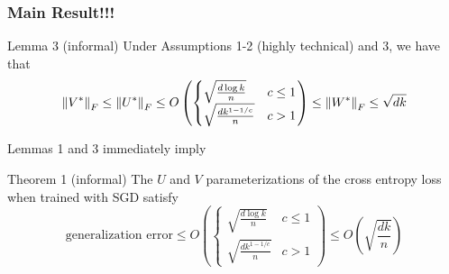 \begin{frame}
\frametitle{Main Result!!!}



\begin{block}{Lemma 3 (informal)}
    Under Assumptions 1-2 (highly technical) and 3, we have that
\begin{equation}
{\lVert {{V}^{*}} \rVert}_F \le {\lVert {{U}^{*}} \rVert}_F \le 
O\left(
\begin{cases}
\sqrt{\frac{d \log k}{n}} & c \le 1\\
\sqrt{\frac{d k^{1-1/c}}{n}} & c > 1
\end{cases}
\right)
\le {\lVert {{W}^{*}} \rVert}_F \le \sqrt{dk}
\end{equation}
\end{block}

\pause
\vspace{0.1in}
Lemmas 1 and 3 immediately imply

\vspace{0.1in}
\begin{block}{Theorem 1 (informal)}
The $U$ and $V$ parameterizations of the cross entropy loss when trained with SGD satisfy
\begin{equation}
\text{generalization error} \le
O\left(
\begin{cases}
\sqrt{\frac{d \log k}{n}} & c \le 1\\
\sqrt{\frac{d k^{1-1/c}}{n}} & c > 1
\end{cases}
\right)
\le
O\left(\sqrt{\frac{dk}{n}}\right)
\end{equation}
\end{block}

\end{frame}



